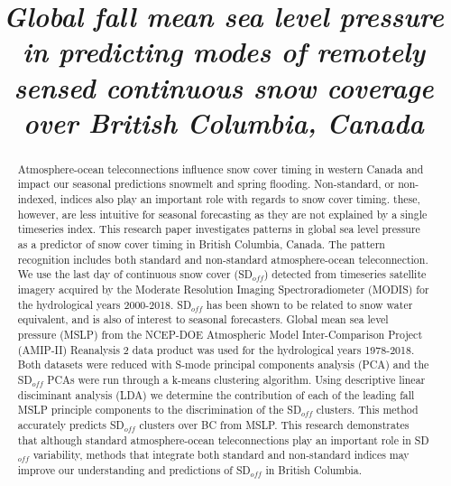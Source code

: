 \documentclass{tATO2e}
\newcommand{\sdoff}{SD$_{off}$}
\begin{document}

\articletype{}%

\title{\textit{Global fall mean sea level pressure in predicting modes of remotely sensed continuous snow coverage over British Columbia, Canada}}

\author{
}

\maketitle

\begin{abstract}
Atmosphere-ocean teleconnections influence snow cover timing in western Canada and impact our seasonal predictions snowmelt and spring flooding. Non-standard, or non-indexed, indices also play an important role with regards to snow cover timing. these, however, are less intuitive for seasonal forecasting as they are not explained by a single timeseries index. This research paper investigates patterns in global sea level pressure as a predictor of snow cover timing in British Columbia, Canada. The pattern recognition includes both standard and non-standard atmosphere-ocean teleconnection. We use the last day of continuous snow cover (\sdoff{}) detected from timeseries satellite imagery acquired by the Moderate Resolution Imaging Spectroradiometer (MODIS) for the hydrological years 2000-2018. \sdoff{} has been shown to be related to snow water equivalent, and is also of interest to seasonal forecasters. Global mean sea level pressure (MSLP) from the NCEP-DOE Atmospheric Model Inter-Comparison Project (AMIP-II) Reanalysis 2 data product was used for the hydrological years 1978-2018. Both datasets were reduced with S-mode principal components analysis (PCA) and the \sdoff{} PCAs were run through a k-means clustering algorithm. Using descriptive linear disciminant analysis (LDA) we determine the contribution of each of the leading fall MSLP principle components to the discrimination of the \sdoff{} clusters. This method accurately predicts \sdoff{} clusters over BC from MSLP. This research demonstrates that although standard atmosphere-ocean teleconnections play an important role in \sdoff{} variability, methods that integrate both standard and non-standard indices may improve our understanding and predictions of \sdoff{} in British Columbia.
\end{abstract}
\end{document}
